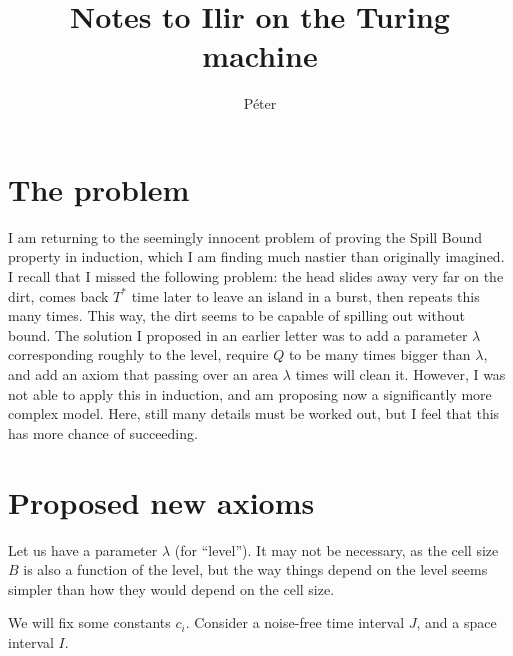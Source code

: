 \documentclass[12pt]{memoir}
\def\B{B}
\newcommand{\Q}{Q}
\newcommand{\Tu}{T}
\begin{document}
\title{Notes to Ilir on the Turing machine}

\author{P\'eter}

\maketitle

\section{The problem}

I am returning to the seemingly innocent problem of proving the Spill Bound property
in induction, which I am finding much nastier than originally imagined.
I recall that I missed the following problem: 
the head slides away very far on the dirt, 
comes back \( \Tu^{*} \) time later to leave an island in a burst, 
then repeats this many times.
This way, the dirt seems to be capable of spilling out without bound.
The solution I proposed in an earlier letter was to add a parameter \( \lambda \)
corresponding roughly to the level, require \( \Q \) to be many times bigger than \( \lambda \),
and add an axiom that passing over an area \( \lambda \) times will clean it.
However, I was not able to apply this in induction, and am proposing now a significantly
more complex model.
Here, still many details must be worked out, but I feel that this has more chance of succeeding.

\section{Proposed new axioms}

Let us have a parameter \( \lambda \) (for ``level'').
It may not be necessary, as the cell size \( \B \) is also a function of the level, but
the way things depend on the level seems simpler than how they would depend on the
cell size.

We will fix some  constants \( c_{i} \).
Consider a noise-free time interval \( J \), and a space interval \( I \).
\end{document}
